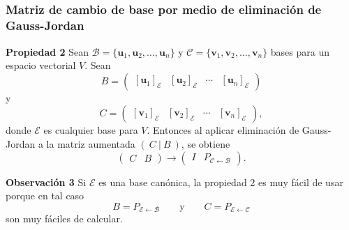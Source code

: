 \subsection{}

{\nologo
\begin{frame}\frametitle{Matriz de cambio de base por medio de eliminación de Gauss-Jordan}

\vspace{-2mm}
\begin{prop}{\textbf{Propiedad 2}}
	\justifying
	Sean $\mathcal{B}=\{\mathbf{u}_1, \mathbf{u}_2, \hdots , \mathbf{u}_n \}$ y $\mathcal{C}=\{\mathbf{v}_1, \mathbf{v}_2, \hdots , \mathbf{v}_n \}$  bases para un espacio  vectorial $V$. Sean
	\[
	B = \left( 
	\begin{array}{c|c|c|c} \left[ \mathbf{u}_1 \right]_{\mathcal{E}} & \left[ \mathbf{u}_2 \right]_{\mathcal{E}} & \cdots & \left[ \mathbf{u}_n \right]_{\mathcal{E}}
	\end{array} 
	\right)
	\]
	y 
	\[
	C = \left( 
	\begin{array}{c|c|c|c} \left[ \mathbf{v}_1 \right]_{\mathcal{E}} & \left[ \mathbf{v}_2 \right]_{\mathcal{E}} & \cdots & \left[ \mathbf{v}_n \right]_{\mathcal{E}}
	\end{array} 
	\right),
	\]
	donde $\mathcal{E}$ es cualquier base para $V$. Entonces al aplicar eliminación de Gauss-Jordan a la matriz aumentada $(\ C\ |\ B\ )$, se obtiene
	\[	
	\left( 
	\begin{array}{c|c} C & B
	\end{array} 
	\right)
	\longrightarrow
	\left( 
	\begin{array}{c|c} I & P_{\mathcal{C} \leftarrow\mathcal{B}}
	\end{array} 
	\right).
	\]
\end{prop}	

\begin{alertblock}{\textbf{Observación 3}}
	Si $\mathcal{E}$ es una base canónica, la propiedad 2 es muy fácil de usar porque en tal caso
	\[
		B = P_{\mathcal{E} \leftarrow\mathcal{B}} \qquad \text{y} \qquad 
		C = P_{\mathcal{E} \leftarrow\mathcal{C}}
	\]
	son muy fáciles de calcular.
\end{alertblock}

\end{frame}
}


\subsection{}

